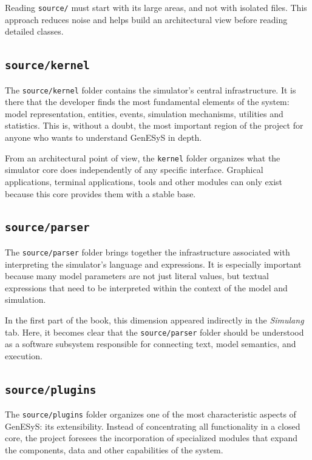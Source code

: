 Reading \texttt{source/} must start with its large areas, and not with isolated files. This approach reduces noise and helps build an architectural view before reading detailed classes.

\subsection{\texttt{source/kernel}}
\label{subsec:cap6_source_kernel}

The \texttt{source/kernel} folder contains the simulator's central infrastructure. It is there that the developer finds the most fundamental elements of the system: model representation, entities, events, simulation mechanisms, utilities and statistics. This is, without a doubt, the most important region of the project for anyone who wants to understand GenESyS in depth.

From an architectural point of view, the \texttt{kernel} folder organizes what the simulator core does independently of any specific interface. Graphical applications, terminal applications, tools and other modules can only exist because this core provides them with a stable base.

\subsection{\texttt{source/parser}}
\label{subsec:cap6_source_parser}

The \texttt{source/parser} folder brings together the infrastructure associated with interpreting the simulator's language and expressions. It is especially important because many model parameters are not just literal values, but textual expressions that need to be interpreted within the context of the model and simulation.

In the first part of the book, this dimension appeared indirectly in the \textit{Simulang} tab. Here, it becomes clear that the \texttt{source/parser} folder should be understood as a software subsystem responsible for connecting text, model semantics, and execution.

\subsection{\texttt{source/plugins}}
\label{subsec:cap6_source_plugins}

The \texttt{source/plugins} folder organizes one of the most characteristic aspects of GenESyS: its extensibility. Instead of concentrating all functionality in a closed core, the project foresees the incorporation of specialized modules that expand the components, data and other capabilities of the system.

